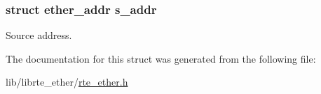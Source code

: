 \subsubsection[{s\+\_\+addr}]{\setlength{\rightskip}{0pt plus 5cm}struct {\bf ether\+\_\+addr} s\+\_\+addr}\label{structether__hdr_a10047aa0ea4caae2a392e4d5850deb6f}
Source address. 

The documentation for this struct was generated from the following file\+:\begin{DoxyCompactItemize}
\item 
lib/librte\+\_\+ether/\hyperlink{rte__ether_8h}{rte\+\_\+ether.\+h}\end{DoxyCompactItemize}
